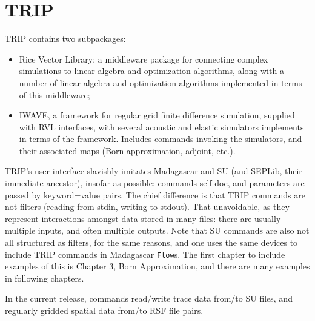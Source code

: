 \section{TRIP}
TRIP contains two subpackages:
\begin{itemize}
\item Rice Vector Library: a middleware package for connecting complex simulations to linear algebra and optimization algorithms, along with a number of linear algebra and optimization algorithms implemented in terms of this middleware;
\item IWAVE, a framework for regular grid finite difference simulation, supplied with RVL interfaces, with several acoustic and elastic simulators implements in terms of the framework. Includes commands invoking the simulators, and their associated maps (Born approximation, adjoint, etc.).
\end{itemize}
TRIP's user interface slavishly imitates Madagascar and SU (and SEPLib, their immediate ancestor), insofar as possible: commands self-doc, and parameters are passed by keyword=value pairs. The chief difference is that TRIP commands are not filters (reading from stdin, writing to stdout). That unavoidable, as they represent interactions amongst data stored in many files: there are usually multiple inputs, and often multiple outputs. Note that SU commands are also not all structured as filters, for the same reasons, and one uses the same devices to include TRIP commands in Madagascar {\tt Flow}s. The first chapter to include examples of this is Chapter 3, Born Approximation, and there are many examples in following chapters.

In the current release, commands read/write trace data from/to SU files, and regularly gridded spatial data from/to RSF file pairs.


